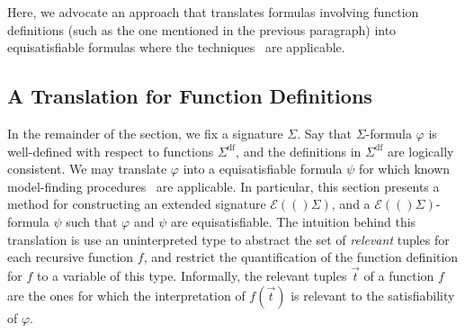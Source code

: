 \documentclass[runningheads,a4paper]{llncs}
\newcommand{\sfundefs}[1]{#1^\mathrm{df}}
\newcommand{\extendsig}[1]{\mathcal{E}( #1 )}
\begin{document}
Here, we advocate an approach that translates formulas involving function definitions (such as the one mentioned in the previous paragraph)
into equisatisfiable formulas where the techniques~\cite{GeDeM-CAV-09, ReyEtAl-1-RR-13} are applicable.

\subsection{A Translation for Function Definitions}
\label{sec:encoding}

In the remainder of the section, we fix a signature $\Sigma$.
Say that $\Sigma$-formula $\varphi$ is well-defined with respect to functions $\sfundefs{\Sigma}$, 
and the definitions in $\sfundefs{\Sigma}$ are logically consistent.
We may translate $\varphi$ into a equisatisfiable formula $\psi$ for which known model-finding procedures~\cite{GeDeM-CAV-09, ReyEtAl-1-RR-13} are applicable.
In particular, this section presents a method for constructing an extended signature $\extendsig( \Sigma )$,
and a $\extendsig( \Sigma )$-formula $\psi$ such that $\varphi$ and $\psi$ are equisatisfiable.
The intuition behind this translation is use an uninterpreted type to abstract the set of \emph{relevant} tuples for each recursive function $f$,
and restrict the quantification of the function definition for $f$ to a variable of this type.
Informally, the relevant tuples $\vec t$ of a function $f$ are the ones for which the interpretation of $f( \vec t )$ is relevant to the satisfiability of $\varphi$.
\end{document}

